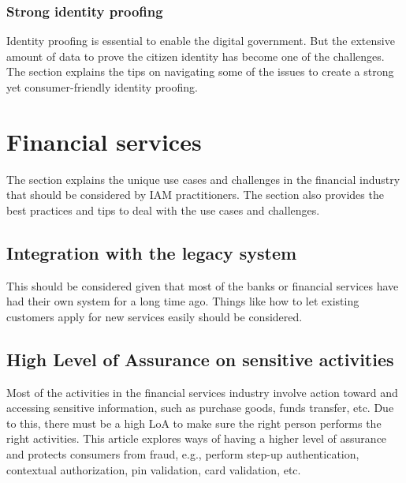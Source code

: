 \hypertarget{strong-identity-proofing}{%
\subsection{Strong identity
proofing}\label{strong-identity-proofing}}

Identity proofing is essential to enable the digital government. But the
extensive amount of data to prove the citizen identity has become one of
the challenges. The section explains the tips on navigating some of the
issues to create a strong yet consumer-friendly identity proofing.

\hypertarget{financial-services}{%
\chapter{Financial services}\label{financial-services}}

The section explains the unique use cases and challenges in the
financial industry that should be considered by IAM practitioners. The
section also provides the best practices and tips to deal with the use
cases and challenges.

\hypertarget{integration-with-the-legacy-system}{%
\section{Integration with the legacy
system}\label{integration-with-the-legacy-system}}

This should be considered given that most of the banks or financial
services have had their own system for a long time ago. Things like how
to let existing customers apply for new services easily should be
considered.

\hypertarget{high-level-of-assurance-on-sensitive-activities}{%
\section{High Level of Assurance on sensitive
activities}\label{high-level-of-assurance-on-sensitive-activities}}

Most of the activities in the financial services industry involve action
toward and accessing sensitive information, such as purchase goods,
funds transfer, etc. Due to this, there must be a high LoA to make sure
the right person performs the right activities. This article explores
ways of having a higher level of assurance and protects consumers from
fraud, e.g., perform step-up authentication, contextual authorization,
pin validation, card validation, etc.

